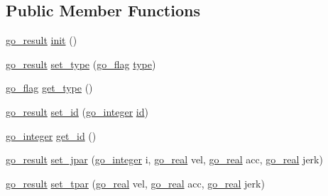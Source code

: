 \subsection*{Public Member Functions}
\begin{DoxyCompactItemize}
\item 
\hyperlink{gotypes_8h_a55d48b38cd959f63c7e8db8337a9792a}{go\-\_\-result} \hyperlink{structgomotion_1_1go__motion__spec_a8a2282df2425f0eb1f258d1d0fadff5a}{init} ()
\item 
\hyperlink{gotypes_8h_a55d48b38cd959f63c7e8db8337a9792a}{go\-\_\-result} \hyperlink{structgomotion_1_1go__motion__spec_a65efbbc70caff991679bbdd49fc9ccb9}{set\-\_\-type} (\hyperlink{gotypes_8h_ae890d9a0ddecc0d3073622cc4312092d}{go\-\_\-flag} \hyperlink{structgomotion_1_1go__motion__spec_a186231a66a1f1f6d6628cd23baf60530}{type})
\item 
\hyperlink{gotypes_8h_ae890d9a0ddecc0d3073622cc4312092d}{go\-\_\-flag} \hyperlink{structgomotion_1_1go__motion__spec_a2d7aaadc8a968d43b563d83ad4d52cb3}{get\-\_\-type} ()
\item 
\hyperlink{gotypes_8h_a55d48b38cd959f63c7e8db8337a9792a}{go\-\_\-result} \hyperlink{structgomotion_1_1go__motion__spec_af5bd0446eb32dd4dfe9ae8811f820909}{set\-\_\-id} (\hyperlink{gotypes_8h_a7d30f606bb0f58ffe2b3bd71e5c8af5c}{go\-\_\-integer} \hyperlink{structgomotion_1_1go__motion__spec_a09732ca7aaddfa7a637f171766329931}{id})
\item 
\hyperlink{gotypes_8h_a7d30f606bb0f58ffe2b3bd71e5c8af5c}{go\-\_\-integer} \hyperlink{structgomotion_1_1go__motion__spec_a2ed1b68537a42747a67507eba4757b4f}{get\-\_\-id} ()
\item 
\hyperlink{gotypes_8h_a55d48b38cd959f63c7e8db8337a9792a}{go\-\_\-result} \hyperlink{structgomotion_1_1go__motion__spec_a5871885be899af7b09a7ec0f12945ece}{set\-\_\-jpar} (\hyperlink{gotypes_8h_a7d30f606bb0f58ffe2b3bd71e5c8af5c}{go\-\_\-integer} i, \hyperlink{gotypes_8h_afd666a2393eebd71ee455846ac9def9b}{go\-\_\-real} vel, \hyperlink{gotypes_8h_afd666a2393eebd71ee455846ac9def9b}{go\-\_\-real} acc, \hyperlink{gotypes_8h_afd666a2393eebd71ee455846ac9def9b}{go\-\_\-real} jerk)
\item 
\hyperlink{gotypes_8h_a55d48b38cd959f63c7e8db8337a9792a}{go\-\_\-result} \hyperlink{structgomotion_1_1go__motion__spec_a31bdbdc08c0f922214a9c53d7dbc37ae}{set\-\_\-tpar} (\hyperlink{gotypes_8h_afd666a2393eebd71ee455846ac9def9b}{go\-\_\-real} vel, \hyperlink{gotypes_8h_afd666a2393eebd71ee455846ac9def9b}{go\-\_\-real} acc, \hyperlink{gotypes_8h_afd666a2393eebd71ee455846ac9def9b}{go\-\_\-real} jerk)

\end{DoxyCompactItemize}
